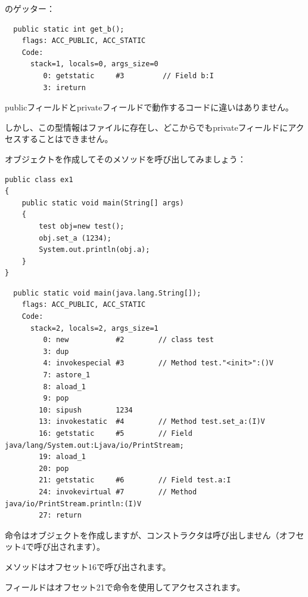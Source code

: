 のゲッター：

\begin{lstlisting}
  public static int get_b();
    flags: ACC_PUBLIC, ACC_STATIC
    Code:
      stack=1, locals=0, args_size=0
         0: getstatic     #3         // Field b:I
         3: ireturn       
\end{lstlisting}

publicフィールドとprivateフィールドで動作するコードに違いはありません。

しかし、この型情報はファイルに存在し、どこからでもprivateフィールドにアクセスすることはできません。


オブジェクトを作成してそのメソッドを呼び出してみましょう：


\begin{lstlisting}[caption=ex1.java,style=customjava]
public class ex1
{
	public static void main(String[] args)
	{
		test obj=new test();
		obj.set_a (1234);
		System.out.println(obj.a);
	}
}
\end{lstlisting}

\begin{lstlisting}
  public static void main(java.lang.String[]);
    flags: ACC_PUBLIC, ACC_STATIC
    Code:
      stack=2, locals=2, args_size=1
         0: new           #2        // class test
         3: dup           
         4: invokespecial #3        // Method test."<init>":()V
         7: astore_1      
         8: aload_1       
         9: pop           
        10: sipush        1234
        13: invokestatic  #4        // Method test.set_a:(I)V
        16: getstatic     #5        // Field java/lang/System.out:Ljava/io/PrintStream;
        19: aload_1       
        20: pop           
        21: getstatic     #6        // Field test.a:I
        24: invokevirtual #7        // Method java/io/PrintStream.println:(I)V
        27: return        
\end{lstlisting}

命令はオブジェクトを作成しますが、コンストラクタは呼び出しません（オフセット4で呼び出されます）。

メソッドはオフセット16で呼び出されます。

フィールドはオフセット21で命令を使用してアクセスされます。

